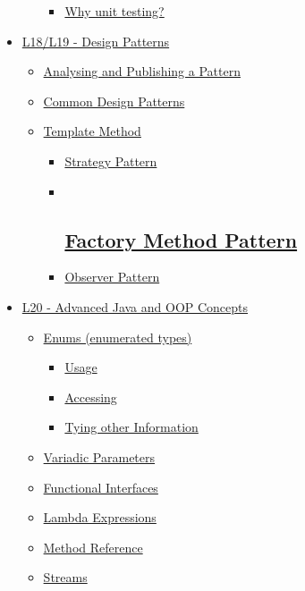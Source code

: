 \documentclass[]{article}
\providecommand{\tightlist}{%
  \setlength{\itemsep}{0pt}\setlength{\parskip}{0pt}}
\begin{document}
\begin{itemize}
\begin{itemize}
    \begin{itemize}
    \tightlist
    \item
      \protect\hyperlink{why-unit-testingux3f}{Why unit testing?}
    \end{itemize}
  \end{itemize}
\item
  \protect\hyperlink{l18ux2fl19---design-patterns}{L18/L19 - Design
  Patterns}

  \begin{itemize}
  \tightlist
  \item
    \protect\hyperlink{analysing-and-publishing-a-pattern}{Analysing and
    Publishing a Pattern}
  \item
    \protect\hyperlink{common-design-patterns}{Common Design Patterns}
  \item
    \protect\hyperlink{template-method}{Template Method}

    \begin{itemize}
    \item
      \protect\hyperlink{strategy-pattern}{Strategy Pattern}
    \item ~
      \hypertarget{factory-method-pattern}{%
      \subsection{\texorpdfstring{\protect\hyperlink{factory-method-pattern}{Factory
      Method
      Pattern}}{Factory Method Pattern}}\label{factory-method-pattern}}
    \item
      \protect\hyperlink{observer-pattern}{Observer Pattern}
    \end{itemize}
  \end{itemize}
\item
  \protect\hyperlink{l20---advanced-java-and-oop-concepts}{L20 -
  Advanced Java and OOP Concepts}

  \begin{itemize}
  \tightlist
  \item
    \protect\hyperlink{enums-enumerated-types}{Enums (enumerated types)}

    \begin{itemize}
    \tightlist
    \item
      \protect\hyperlink{usage}{Usage}
    \item
      \protect\hyperlink{accessing}{Accessing}
    \item
      \protect\hyperlink{tying-other-information}{Tying other
      Information}
    \end{itemize}
  \item
    \protect\hyperlink{variadic-parameters}{Variadic Parameters}
  \item
    \protect\hyperlink{functional-interfaces}{Functional Interfaces}
  \item
    \protect\hyperlink{lambda-expressions}{Lambda Expressions}
  \item
    \protect\hyperlink{method-reference}{Method Reference}
  \item
    \protect\hyperlink{streams}{Streams}


\end{itemize}
\end{itemize}
\end{document}
